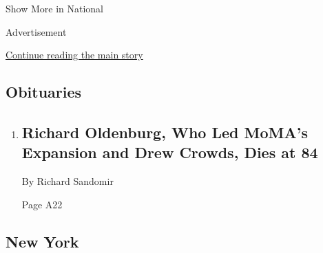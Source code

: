 Show More in National

Advertisement

\protect\hyperlink{after-mid2}{Continue reading the main story}

\hypertarget{obituaries}{%
\subsection{Obituaries}\label{obituaries}}

\begin{enumerate}
\def\labelenumi{\arabic{enumi}.}
\item
  \href{/2018/04/20/obituaries/richard-oldenburg-who-led-momas-expansion-and-drew-crowds-dies-at-84.html}{}

  \hypertarget{richard-oldenburg-who-led-momas-expansion-and-drew-crowds-dies-at-84}{%
  \subsection{Richard Oldenburg, Who Led MoMA's Expansion and Drew
  Crowds, Dies at
  84}\label{richard-oldenburg-who-led-momas-expansion-and-drew-crowds-dies-at-84}}

  By Richard Sandomir

  Page A22
\end{enumerate}

\hypertarget{new-york}{%
\subsection{New York}\label{new-york}}

